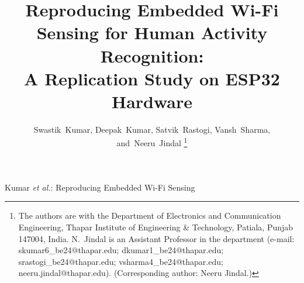 \documentclass[journal]{IEEEtran}
\begin{document}
\title{Reproducing Embedded Wi-Fi Sensing for Human Activity Recognition:\\
A Replication Study on ESP32 Hardware}

\author{Swastik~Kumar,
        Deepak~Kumar,
        Satvik~Rastogi,
        Vansh~Sharma,
        and~Neeru~Jindal%
\thanks{The authors are with the Department of Electronics and Communication
Engineering, Thapar Institute of Engineering \& Technology, Patiala, Punjab 147004,
India. N.~Jindal is an Assistant Professor in the department
(e-mail: skumar6\_be24@thapar.edu; dkumar1\_be24@thapar.edu;
srastogi\_be24@thapar.edu; vsharma4\_be24@thapar.edu; neeru.jindal@thapar.edu).
(Corresponding author: Neeru Jindal.)}}

%
{Kumar \MakeLowercase{\textit{et al.}}: Reproducing Embedded Wi-Fi Sensing}

\maketitle
\end{document}
